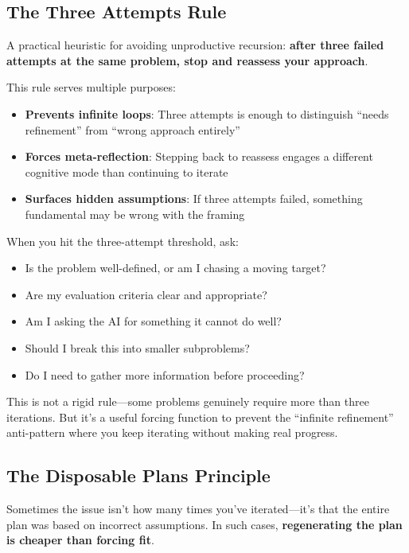\subsection{The Three Attempts Rule}

A practical heuristic for avoiding unproductive recursion: \textbf{after three failed attempts at the same problem, stop and reassess your approach}.

This rule serves multiple purposes:
\begin{itemize}
    \item \textbf{Prevents infinite loops}: Three attempts is enough to distinguish ``needs refinement'' from ``wrong approach entirely''
    \item \textbf{Forces meta-reflection}: Stepping back to reassess engages a different cognitive mode than continuing to iterate
    \item \textbf{Surfaces hidden assumptions}: If three attempts failed, something fundamental may be wrong with the framing
\end{itemize}

When you hit the three-attempt threshold, ask:
\begin{itemize}
    \item Is the problem well-defined, or am I chasing a moving target?
    \item Are my evaluation criteria clear and appropriate?
    \item Am I asking the AI for something it cannot do well?
    \item Should I break this into smaller subproblems?
    \item Do I need to gather more information before proceeding?
\end{itemize}

This is not a rigid rule---some problems genuinely require more than three iterations. But it's a useful forcing function to prevent the ``infinite refinement'' anti-pattern where you keep iterating without making real progress.

\subsection{The Disposable Plans Principle}

Sometimes the issue isn't how many times you've iterated---it's that the entire plan was based on incorrect assumptions. In such cases, \textbf{regenerating the plan is cheaper than forcing fit}.

